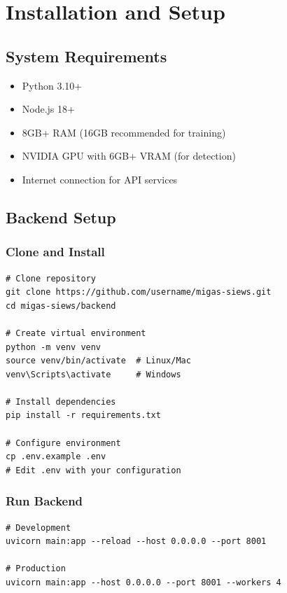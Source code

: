 \documentclass[12pt,a4paper,oneside]{book}
\begin{document}
\chapter{Installation and Setup}

\section{System Requirements}

\begin{itemize}
    \item Python 3.10+
    \item Node.js 18+
    \item 8GB+ RAM (16GB recommended for training)
    \item NVIDIA GPU with 6GB+ VRAM (for detection)
    \item Internet connection for API services
\end{itemize}

\section{Backend Setup}

\subsection{Clone and Install}

\begin{verbatim}
# Clone repository
git clone https://github.com/username/migas-siews.git
cd migas-siews/backend

# Create virtual environment
python -m venv venv
source venv/bin/activate  # Linux/Mac
venv\Scripts\activate     # Windows

# Install dependencies
pip install -r requirements.txt

# Configure environment
cp .env.example .env
# Edit .env with your configuration
\end{verbatim}

\subsection{Run Backend}

\begin{verbatim}
# Development
uvicorn main:app --reload --host 0.0.0.0 --port 8001

# Production
uvicorn main:app --host 0.0.0.0 --port 8001 --workers 4
\end{verbatim}
\end{document}
